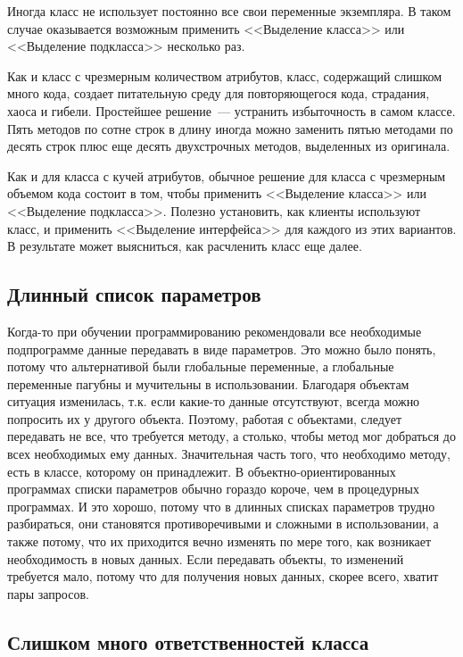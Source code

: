 \documentclass{../../text-style}
\begin{document}
Иногда класс не использует постоянно все свои переменные экземпляра. В таком случае оказывается возможным применить <<Выделение класса>> или <<Выделение подкласса>> несколько раз.

Как и класс с чрезмерным количеством атрибутов, класс, содержащий слишком много кода, создает питательную среду для повторяющегося кода, страдания, хаоса и гибели. Простейшее решение~--- устранить избыточность в самом классе. Пять методов по сотне строк в длину иногда можно заменить пятью методами по десять строк плюс еще десять двухстрочных методов, выделенных из оригинала.

Как и для класса с кучей атрибутов, обычное решение для класса с чрезмерным объемом кода состоит в том, чтобы применить <<Выделение класса>> или <<Выделение подкласса>>. Полезно установить, как клиенты используют класс, и применить <<Выделение интерфейса>> для каждого из этих вариантов. В результате может выясниться, как расчленить класс еще далее.

\subsection{Длинный список параметров}

Когда-то при обучении программированию рекомендовали все необходимые подпрограмме данные передавать в виде параметров. Это можно было понять, потому что альтернативой были глобальные переменные, а глобальные переменные пагубны и мучительны в использовании. Благодаря объектам ситуация изменилась, т.к. если какие-то данные отсутствуют, всегда можно попросить их у другого объекта. Поэтому, работая с объектами, следует передавать не все, что требуется методу, а столько, чтобы метод мог добраться до всех необходимых ему данных. Значительная часть того, что необходимо методу, есть в классе, которому он принадлежит. В объектно-ориентированных программах списки параметров обычно гораздо короче, чем в процедурных программах. И это хорошо, потому что в длинных списках параметров трудно разбираться, они становятся противоречивыми и сложными в использовании, а также потому, что их приходится вечно изменять по мере того, как возникает необходимость в новых данных. Если передавать объекты, то изменений требуется мало, потому что для получения новых данных, скорее всего, хватит пары запросов.

\subsection{Слишком много ответственностей класса}
\end{document}
